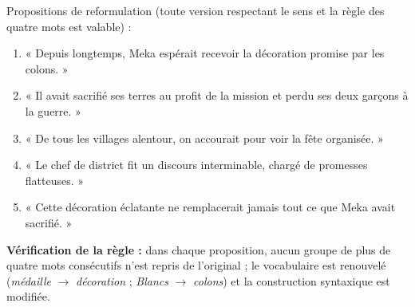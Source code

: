 \documentclass[11pt]{article}
\begin{document}
\begin{corrige}
Propositions de reformulation (toute version respectant le sens et la règle des quatre mots est valable) :
\begin{enumerate}
\item « Depuis longtemps, Meka espérait recevoir la décoration promise par les colons. »
\item « Il avait sacrifié ses terres au profit de la mission et perdu ses deux garçons à la guerre. »
\item « De tous les villages alentour, on accourait pour voir la fête organisée. »
\item « Le chef de district fit un discours interminable, chargé de promesses flatteuses. »
\item « Cette décoration éclatante ne remplacerait jamais tout ce que Meka avait sacrifié. »
\end{enumerate}
\textbf{Vérification de la règle :} dans chaque proposition, aucun groupe de plus de quatre mots consécutifs n'est repris de l'original ; le vocabulaire est renouvelé (\emph{médaille} $\rightarrow$ \emph{décoration} ; \emph{Blancs} $\rightarrow$ \emph{colons}) et la construction syntaxique est modifiée.
\end{corrige}
\end{document}
